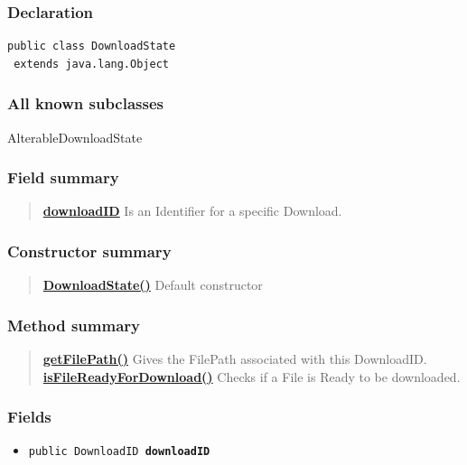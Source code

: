 {{{{{{{{{{{{{{{{\subsubsection{Declaration}{
\begin{lstlisting}[frame=none]
public class DownloadState
 extends java.lang.Object\end{lstlisting}
\subsubsection{All known subclasses}{AlterableDownloadState\small{}}
\subsubsection{Field summary}{
\begin{verse}
\hyperlink{Download.DownloadState.downloadID}{{\bf downloadID}} Is an Identifier for a specific Download.\\
\end{verse}
}
\subsubsection{Constructor summary}{
\begin{verse}
\hyperlink{Download.DownloadState()}{{\bf DownloadState()}} Default constructor\\
\end{verse}
}
\subsubsection{Method summary}{
\begin{verse}
\hyperlink{Download.DownloadState.getFilePath()}{{\bf getFilePath()}} Gives the FilePath associated with this DownloadID.\\
\hyperlink{Download.DownloadState.isFileReadyForDownload()}{{\bf isFileReadyForDownload()}} Checks if a File is Ready to be downloaded.\\
\end{verse}
}
\subsubsection{Fields}{
\begin{itemize}
\item{
\label{Download.DownloadState.downloadID}\hypertarget{Download.DownloadState.downloadID}{\texttt{public DownloadID\ {\bf  downloadID}}
}
}
\end{itemize}
}
}}}}}}}}}}}}}}}}}
